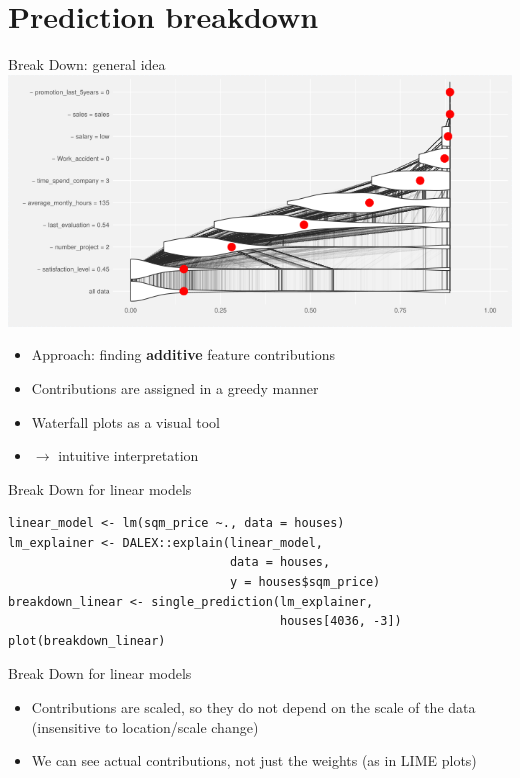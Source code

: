 \documentclass[xcolor={dvipsnames}]{beamer}
\begin{document}
\section{Prediction breakdown}

\begin{frame}{Break Down: general idea}
	\includegraphics[scale=0.45]{ilustracje_erum/breakdown_intuition.png}
	\begin{itemize}
		\item Approach: finding \textbf{additive} feature contributions
		
		\item Contributions are assigned in a greedy manner
		
		\item Waterfall plots as a visual tool
		
		\item $\rightarrow$ intuitive interpretation
	\end{itemize}
\end{frame}

\begin{frame}[fragile]{Break Down for linear models}
	\begin{lstlisting}
linear_model <- lm(sqm_price ~., data = houses)
lm_explainer <- DALEX::explain(linear_model, 
		                       data = houses, 
		                       y = houses$sqm_price)
breakdown_linear <- single_prediction(lm_explainer, 
		                              houses[4036, -3])
plot(breakdown_linear)
	\end{lstlisting}
\end{frame}

\begin{frame}{Break Down for linear models}
	\begin{itemize}
		\item Contributions are scaled, so they do not depend on the scale of the data (insensitive to location/scale change)
		\item We can see actual contributions, not just the weights (as in LIME plots)
	\end{itemize}
\end{frame}
\end{document}
